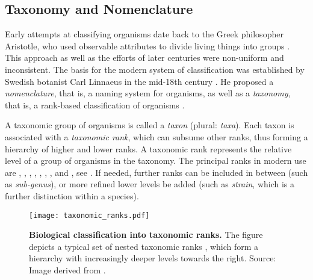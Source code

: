 


\subsection{Taxonomy and Nomenclature}
\label{ch:Foundations:sec:TreeOfLife:sub:TaxonomyNomenclature}

Early attempts at classifying organisms date back to the Greek philosopher Aristotle,
who used observable attributes to divide living things into groups \cite{Leroi2014}.
This approach as well as the efforts of later centuries were non-uniform and inconsistent.
The basis for the modern system of classification was established
by Swedish botanist Carl Linnaeus in the mid-18th century \cite{Donk1957}.
He proposed a \emph{nomenclature}, that is, a naming system for organisms,
as well as a \emph{taxonomy}, that is, a rank-based classification of organisms \cite{Linnaeus1735,Linnaeus1753}.

A taxonomic group of organisms is called a \emph{taxon} (plural: \emph{taxa}).
Each taxon is associated with a \emph{taxonomic rank}, which can subsume other ranks,
thus forming a hierarchy of higher and lower ranks.
A taxonomic rank represents the relative level of a group of organisms in the taxonomy.
The principal ranks in modern use are , , , ,
, , , and ,
see .
If needed, further ranks can be included in between (such as \emph{sub-genus}),
or more refined lower levels be added (such as \emph{strain}, which is a further distinction within a species).

\begin{figure}[hpbt]
    \centering
    \texttt{[image: taxonomic\_ranks.pdf]}
    \caption[Biological classification into taxonomic ranks]{
        \textbf{Biological classification into taxonomic ranks.}
        The figure depicts a typical set of nested taxonomic ranks \cite{Woese1990},
        which form a hierarchy with increasingly deeper levels towards the right.
        Source: Image derived from \cite{Halasz2007}.
    }
    \label{fig:taxonomic_ranks}
\end{figure}

